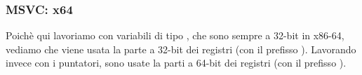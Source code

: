 \subsubsection{MSVC: x64}


Poichè qui lavoriamo con variabili di tipo \Tint{}, che sono sempre a 32-bit in x86-64, vediamo che viene usata la parte a 32-bit dei registri (con il prefisso ).
Lavorando invece con i puntatori, sono usate la parti a 64-bit dei registri (con il prefisso ).



